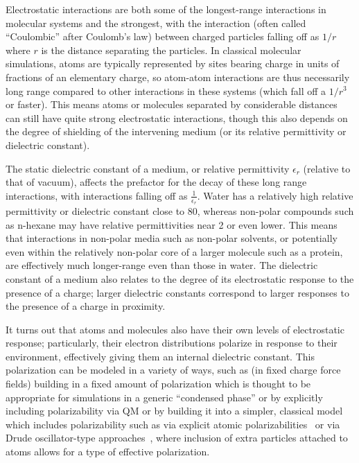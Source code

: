 \documentclass[9pt,bestpractices]{livecoms}
\begin{document}
Electrostatic interactions are both some of the longest-range interactions in molecular systems and the strongest, with the interaction (often called
``Coulombic'' after Coulomb's law) between charged particles falling off as $1/r$ where $r$ is the distance separating the particles. 
In classical molecular simulations, atoms are typically represented by sites bearing charge in units of fractions of an elementary charge, so atom-atom interactions are thus necessarily long range compared to other interactions in these systems (which fall off a $1/r^3$ or faster).  
This means atoms or molecules separated by considerable distances can still have quite strong electrostatic interactions, though this also depends on the degree of shielding of the intervening medium (or its relative permittivity or dielectric constant).

The static dielectric constant of a medium, or relative permittivity $\epsilon_r$ (relative to that of vacuum), affects the prefactor for the decay of these long range interactions, with interactions falling off as $\frac{1}{\epsilon_r}$. 
Water has a relatively high relative permittivity or dielectric constant close to 80, whereas non-polar compounds such as n-hexane may have relative permittivities near 2 or even lower. 
This means that interactions in non-polar media such as non-polar solvents, or potentially even within the relatively non-polar core of a larger molecule such as a protein, are effectively much longer-range even than those in water. 
The dielectric constant of a medium also relates to the degree of its electrostatic response to the presence of a charge; larger dielectric constants correspond to larger responses to the presence of a charge in proximity.

It turns out that atoms and molecules also have their own levels of electrostatic response; particularly, their electron distributions polarize in response to their environment, effectively giving them an internal dielectric constant. 
This polarization can be modeled in a variety of ways, such as (in fixed charge force fields) building in a fixed amount of polarization which is thought to be appropriate for simulations in a generic ``condensed phase'' or by explicitly including polarizability via QM or by building it into a simpler, classical model which includes polarizability such as via explicit atomic polarizabilities~\cite{Ponder2003, Ponder:2010:J.Phys.Chem.B} or via Drude oscillator-type approaches~\cite{Lemkul:2016:Chem.Rev.}, where inclusion of extra particles attached to atoms allows for a type of effective polarization.
\end{document}
